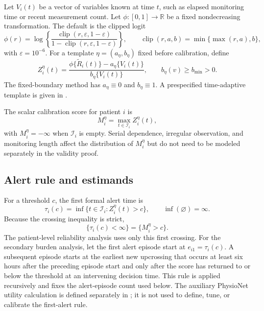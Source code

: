 \documentclass[11pt]{article}
\newcommand{\R}{\mathbb{R}}
\newcommand{\calI}{\mathcal{I}}
\newcommand{\clip}{\operatorname{clip}}
\begin{document}
Let $V_i(t)$ be a vector of variables known at time $t$, such as elapsed monitoring time or recent measurement count. Let $\phi:[0,1]\rightarrow\R$ be a fixed nondecreasing transformation. The default is the clipped logit
\begin{equation}
\phi(r)=\log\left\{
\frac{\clip(r,\varepsilon,1-\varepsilon)}
{1-\clip(r,\varepsilon,1-\varepsilon)}
\right\},
\qquad
\clip(r,a,b)=\min\{\max(r,a),b\},
\label{eq:score-transform}
\end{equation}
with $\varepsilon=10^{-6}$. For a template $\eta=(a_\eta,b_\eta)$ fixed before calibration, define
\begin{equation}
Z_i^{\eta}(t)=
\frac{\phi\{\widetilde R_i(t)\}-a_\eta\{V_i(t)\}}
{b_\eta\{V_i(t)\}},
\qquad b_\eta(v)\ge b_{\min}>0.
\label{eq:standardized-score}
\end{equation}
The fixed-boundary method has $a_\eta\equiv0$ and $b_\eta\equiv1$. A prespecified time-adaptive template is given in .

The scalar calibration score for patient $i$ is
\begin{equation}
M_i^{\eta}=\max_{t\in\calI_i}Z_i^{\eta}(t),
\label{eq:trajectory-score}
\end{equation}
with $M_i^{\eta}=-\infty$ when $\calI_i$ is empty. Serial dependence, irregular observation, and monitoring length affect the distribution of $M_i^{\eta}$ but do not need to be modeled separately in the validity proof.

\subsection{Alert rule and estimands}

For a threshold $c$, the first formal alert time is
\begin{equation}
\tau_i(c)=\inf\{t\in\calI_i:Z_i^{\eta}(t)>c\},
\qquad \inf(\varnothing)=\infty.
\label{eq:first-alert}
\end{equation}
Because the crossing inequality is strict,
\[
\{\tau_i(c)<\infty\}=\{M_i^{\eta}>c\}.
\]
The patient-level reliability analysis uses only this first crossing. For the secondary burden analysis, let the first alert episode start at $e_{i1}=\tau_i(c)$. A subsequent episode starts at the earliest new upcrossing that occurs at least six hours after the preceding episode start and only after the score has returned to or below the threshold at an intervening decision time. This rule is applied recursively and fixes the alert-episode count used below. The auxiliary PhysioNet utility calculation is defined separately in ; it is not used to define, tune, or calibrate the first-alert rule.
\end{document}
